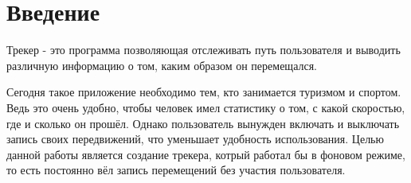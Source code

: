 \documentclass[a4paper,12pt]{article}
\begin{document}
\pagebreak

\newpage

\tableofcontents



\pagebreak



\section*{Введение}

Трекер - это программа позволяющая отслеживать путь пользователя и выводить
различную информацию о том, каким образом он перемещался.

Сегодня такое приложение необходимо тем, кто занимается туризмом и спортом.
Ведь это очень удобно, чтобы человек имел статистику о том, с какой скоростью,
где и сколько он прошёл. Однако пользователь вынужден включать и выключать 
запись своих передвижений, что уменьшает удобность использования.
Целью данной работы является создание трекера, котрый работал бы в фоновом режиме,
то есть постоянно вёл запись перемещений без участия пользователя.
\end{document}
